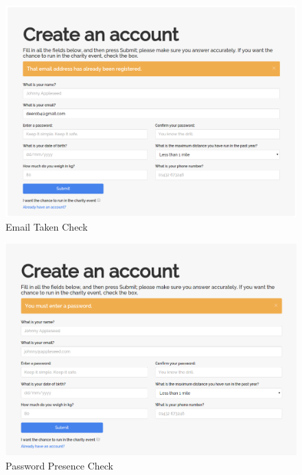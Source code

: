 \documentclass{article}[12pt,a4paper]
\begin{document}
\begin{figure}[h!]
  \includegraphics[scale=0.25]{images/testing/registration_validation/email_taken}
  \caption{Email Taken Check}
\end{figure}

\begin{figure}[h!]
  \includegraphics[scale=0.25]{images/testing/registration_validation/password_presence}
  \caption{Password Presence Check}
\end{figure}
\end{document}
